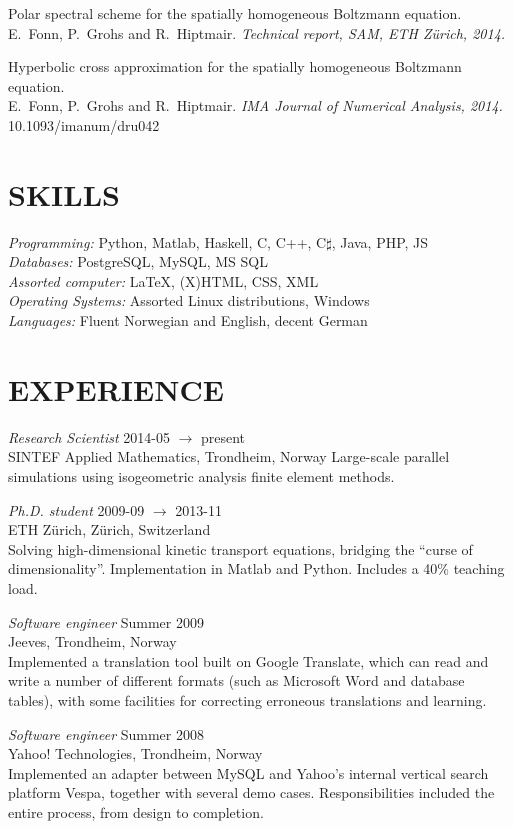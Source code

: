 \documentclass[line,margin]{res}
\newcommand{\zh}{Z\"{u}rich}
\begin{document}
\begin{resume}
Polar spectral scheme for the spatially homogeneous Boltzmann equation. \\
E.~Fonn, P.~Grohs and R.~Hiptmair. {\em Technical report, SAM, ETH \zh, 2014.}

Hyperbolic cross approximation for the spatially homogeneous Boltzmann equation. \\
E.~Fonn, P.~Grohs and R.~Hiptmair. {\em IMA Journal of Numerical Analysis, 2014.} \\
10.1093/imanum/dru042


\section{SKILLS}

{\em Programming:} Python, Matlab, Haskell, C, C++, C$\sharp$, Java, PHP, JS \\
{\em Databases:} PostgreSQL, MySQL, MS SQL \\
{\em Assorted computer:} \LaTeX, (X)HTML, CSS, XML \\
{\em Operating Systems:} Assorted Linux distributions, Windows \\
{\em Languages:} Fluent Norwegian and English, decent German


\section{EXPERIENCE}

{\em Research Scientist} \hfill 2014-05 $\to$ present \\
SINTEF Applied Mathematics, Trondheim, Norway
Large-scale parallel simulations using isogeometric analysis finite element methods.

{\em Ph.D. student} \hfill 2009-09 $\to$ 2013-11 \\
ETH \zh, \zh, Switzerland \\
Solving high-dimensional kinetic transport equations, bridging the ``curse of dimensionality''.
Implementation in Matlab and Python. Includes a 40\% teaching load.

{\em Software engineer} \hfill Summer 2009 \\
Jeeves, Trondheim, Norway \\
Implemented a translation tool built on Google Translate, which can read and write a number of
different formats (such as Microsoft Word and database tables), with some facilities for correcting
erroneous translations and learning.

{\em Software engineer} \hfill Summer 2008 \\
Yahoo! Technologies, Trondheim, Norway \\
Implemented an adapter between MySQL and Yahoo's internal vertical search platform Vespa, together
with several demo cases. Responsibilities included the entire process, from design to completion.


\end{resume}
\end{document}

